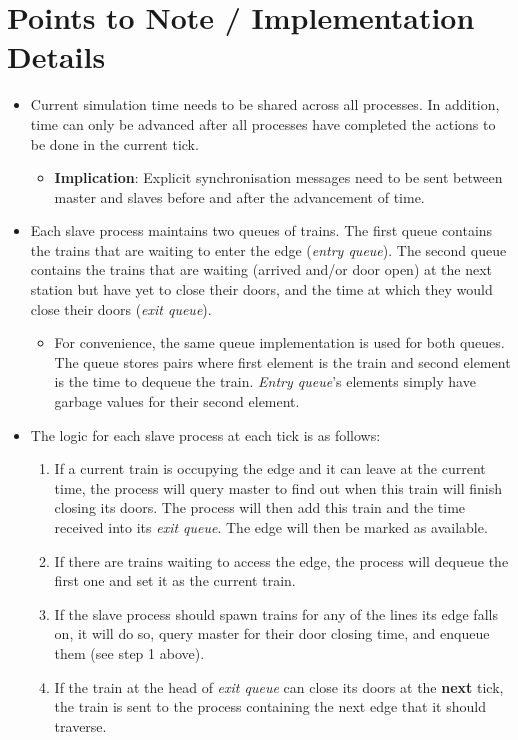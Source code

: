 \documentclass[a4paper,12pt]{article}
\begin{document}
\section{Points to Note / Implementation Details}
\begin{itemize}
	\item Current simulation time needs to be shared across all processes. In addition, time can only be advanced after all processes have completed the actions to be done in the current tick.
	      \begin{itemize}
		      \item \textbf{Implication}: Explicit synchronisation messages need to be sent between master and slaves before and after the advancement of time.
	      \end{itemize}
	\item Each slave process maintains two queues of trains. The first queue contains the trains that are waiting to enter the edge (\textit{entry queue}). The second queue contains the trains that are waiting (arrived and/or door open) at the next station but have yet to close their doors, and the time at which they would close their doors (\textit{exit queue}).
	      \begin{itemize}
		      \item For convenience, the same queue implementation is used for both queues. The queue stores pairs where first element is the train and second element is the time to dequeue the train. \textit{Entry queue}'s elements simply have garbage values for their second element.
	      \end{itemize}
	\item The logic for each slave process at each tick is as follows:
	      \begin{enumerate}
		      \item If a current train is occupying the edge and it can leave at the current time, the process will query master to find out when this train will finish closing its doors. The process will then add this train and the time received into its \textit{exit queue}. The edge will then be marked as available.
		      \item If there are trains waiting to access the edge, the process will dequeue the first one and set it as the current train.
		      \item If the slave process should spawn trains for any of the lines its edge falls on, it will do so, query master for their door closing time, and enqueue them (see step 1 above).
		      \item If the train at the head of \textit{exit queue} can close its doors at the \textbf{next} tick, the train is sent to the process containing the next edge that it should traverse.

\end{enumerate}
\end{itemize}
\end{document}

